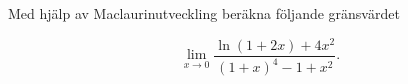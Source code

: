 \documentclass[11pt]{article}
\begin{document}
Med hjälp av Maclaurinutveckling beräkna följande gränsvärdet

\[
    \lim_{x \to 0} \frac{\ln(1 + 2x) + 4x^2}{(1 + x)^4 - 1 + x^2}.
\]
\end{document}
